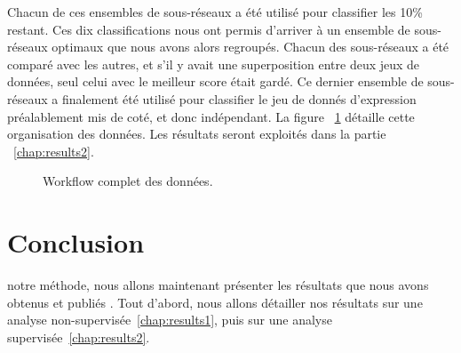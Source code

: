 			Chacun de ces ensembles de sous-réseaux a été utilisé pour classifier les 10\% restant.
			Ces dix classifications nous ont permis d'arriver à un ensemble de sous-réseaux optimaux que nous avons alors regroupés.
			Chacun des sous-réseaux a été comparé avec les autres, et s'il y avait une superposition entre deux jeux de données, seul celui avec le meilleur score était gardé.
			Ce dernier ensemble de sous-réseaux a finalement été utilisé pour classifier le jeu de donnés d'expression préalablement mis de coté, et donc indépendant.
			La figure ~\ref{fig:Workflow} détaille cette organisation des données.
			Les résultats seront exploités dans la partie ~\ref{chap:results2}.

			\begin{figure}
				\begin{center}
					\def\svgwidth{\columnwidth}
					\caption{Workflow complet des données.}
					\label{fig:Workflow}
				\end{center}
			\end{figure}

	\section{\textcolor{green!45!black}{Conclusion}}
		 notre méthode, nous allons maintenant présenter les résultats que nous avons obtenus et publiés \citep{Garcia2011,Garcia2012}. Tout d'abord, nous allons détailler nos résultats sur une analyse non-supervisée~\ref{chap:results1}, puis sur une analyse supervisée~\ref{chap:results2}.
